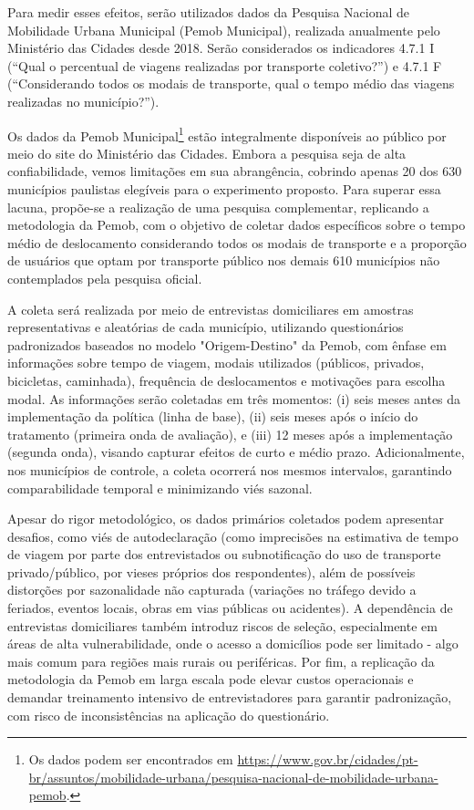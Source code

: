 Para medir esses efeitos, serão utilizados dados da Pesquisa Nacional de Mobilidade Urbana Municipal (Pemob Municipal), realizada anualmente pelo Ministério das Cidades desde 2018. Serão considerados os indicadores 4.7.1 I (“Qual o percentual de viagens realizadas por transporte coletivo?”) e 4.7.1 F (“Considerando todos os modais de transporte, qual o tempo médio das viagens realizadas no município?”). 

Os dados da Pemob Municipal\footnote{Os dados podem ser encontrados em \url{https://www.gov.br/cidades/pt-br/assuntos/mobilidade-urbana/pesquisa-nacional-de-mobilidade-urbana-pemob}.} estão integralmente disponíveis ao público por meio do site do Ministério das Cidades. Embora a pesquisa seja de alta confiabilidade, vemos limitações em sua abrangência, cobrindo apenas 20 dos 630 municípios paulistas elegíveis para o experimento proposto. Para superar essa lacuna, propõe-se a realização de uma pesquisa complementar, replicando a metodologia da Pemob, com o objetivo de coletar dados específicos sobre o tempo médio de deslocamento considerando todos os modais de transporte e a proporção de usuários que optam por transporte público nos demais 610 municípios não contemplados pela pesquisa oficial.  

A coleta será realizada por meio de entrevistas domiciliares em amostras representativas e aleatórias de cada município, utilizando questionários padronizados baseados no modelo "Origem-Destino" da Pemob, com ênfase em informações sobre tempo de viagem, modais utilizados (públicos, privados, bicicletas, caminhada), frequência de deslocamentos e motivações para escolha modal. As informações serão coletadas em três momentos: (i) seis meses antes da implementação da política (linha de base), (ii) seis meses após o início do tratamento (primeira onda de avaliação), e (iii) 12 meses após a implementação (segunda onda), visando capturar efeitos de curto e médio prazo. Adicionalmente, nos municípios de controle, a coleta ocorrerá nos mesmos intervalos, garantindo comparabilidade temporal e minimizando viés sazonal.  

Apesar do rigor metodológico, os dados primários coletados podem apresentar desafios, como viés de autodeclaração (como imprecisões na estimativa de tempo de viagem por parte dos entrevistados ou subnotificação do uso de transporte privado/público, por vieses próprios dos respondentes), além de possíveis distorções por sazonalidade não capturada (variações no tráfego devido a feriados, eventos locais, obras em vias públicas ou acidentes). A dependência de entrevistas domiciliares também introduz riscos de seleção, especialmente em áreas de alta vulnerabilidade, onde o acesso a domicílios pode ser limitado - algo mais comum para regiões mais rurais ou periféricas. Por fim, a replicação da metodologia da Pemob em larga escala pode elevar custos operacionais e demandar treinamento intensivo de entrevistadores para garantir padronização, com risco de inconsistências na aplicação do questionário. 

